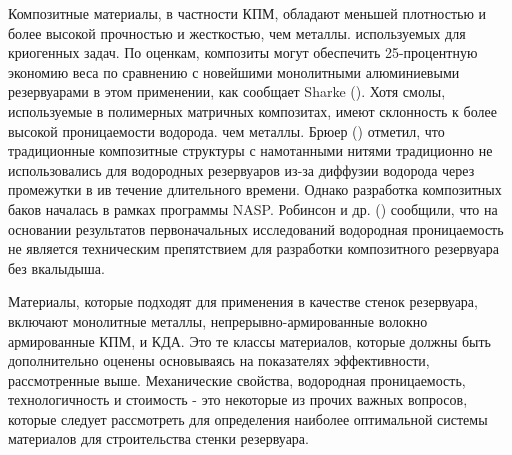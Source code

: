 Композитные материалы, в частности КПМ, обладают меньшей плотностью и более высокой прочностью и жесткостью, чем металлы. используемых для криогенных задач. По оценкам, композиты могут обеспечить 25-процентную экономию веса по сравнению с новейшими монолитными алюминиевыми резервуарами в этом применении, как сообщает Sharke (\cite{sharke2004}).
Хотя смолы, используемые в полимерных матричных композитах, имеют склонность к более высокой проницаемости водорода. чем металлы. Брюер (\cite{brewer1991}) отметил, что традиционные композитные структуры с намотанными нитями традиционно не использовались для водородных резервуаров из-за диффузии водорода через промежутки в ив течение длительного времени. Однако разработка композитных баков началась в рамках программы NASP.  Робинсон и др. (\cite{robinson2002}) сообщили, что на основании результатов первоначальных исследований водородная проницаемость не является техническим препятствием для разработки композитного резервуара без вкалыдыша.

Материалы, которые подходят для применения в качестве стенок резервуара, включают монолитные металлы, непрерывно-армированные волокно армированные КПМ, и КДА. Это те классы материалов, которые должны быть дополнительно оценены основываясь на показателях эффективности, рассмотренные выше. Механические свойства, водородная проницаемость, технологичность и стоимость - это некоторые из прочих важных вопросов, которые следует рассмотреть для определения наиболее оптимальной системы материалов для строительства стенки резервуара.